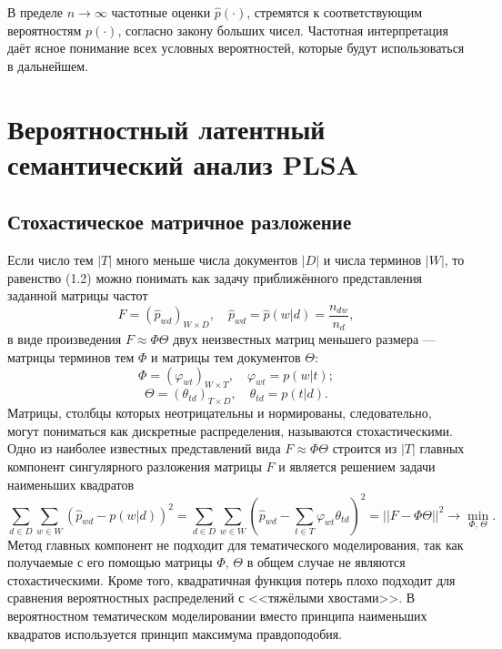 \documentclass[article, 10pt]{disser}
\begin{document}
В пределе $n \rightarrow \infty$ частотные оценки $\hat{p}(\cdot)$, стремятся к соответствующим вероятностям $p(\cdot)$, согласно закону больших чисел. Частотная интерпретация даёт ясное понимание всех условных вероятностей, которые будут использоваться в дальнейшем.


\section{Вероятностный латентный семантический анализ PLSA}
\subsection{Стохастическое матричное разложение}
Если число тем $|T|$ много меньше числа документов $|D|$ и числа терминов $|W|$, то равенство (1.2) можно понимать как задачу
приближённого представления заданной матрицы частот
\begin{equation*}
    F = (\hat{p}_{wd})_{W \times D},\quad \hat{p}_{wd} = \hat{p}(w | d) = \frac{n_{dw}}{n_d},
\end{equation*}
в виде произведения $F \approx \Phi\Theta$ двух неизвестных матриц меньшего размера --- матрицы терминов тем $\Phi$ и матрицы тем документов $\Theta$:
\begin{equation*}
    \Phi = (\varphi_{wt})_{W \times T},\quad \varphi_{wt} = p(w |t);
\end{equation*}
\begin{equation*}
    \Theta = (\theta_{td})_{T \times D},\quad \theta_{td} = p(t| d).
\end{equation*}
Матрицы, столбцы которых неотрицательны и нормированы, следовательно, могут пониматься как дискретные распределения, называются стохастическими. Одно из наиболее известных представлений вида $F \approx \Phi\Theta$ строится из $|T|$ главных компонент сингулярного разложения матрицы $F$ и является решением задачи наименьших квадратов
\begin{equation*}
    \sum\limits_{d \in D}\sum\limits_{w \in W}\left(\hat{p}_{wd} - p(w | d)\right)^{2} = \sum\limits_{d \in D}\sum\limits_{w \in W}\left(\hat{p}_{wd} - \sum\limits_{t \in T}\varphi_{wt}\theta_{td}\right)^{2}= ||F - \Phi\Theta||^{2} \rightarrow  \min\limits_{\Phi,\,\Theta}.
\end{equation*}
Метод главных компонент не подходит для тематического моделирования, так как получаемые с его помощью матрицы $\Phi,\, \Theta$ в общем случае не являются стохастическими. Кроме того, квадратичная функция потерь плохо подходит для сравнения вероятностных распределений с <<тяжёлыми хвостами>>. В вероятностном тематическом моделировании вместо принципа наименьших квадратов используется принцип максимума правдоподобия.
\end{document}
